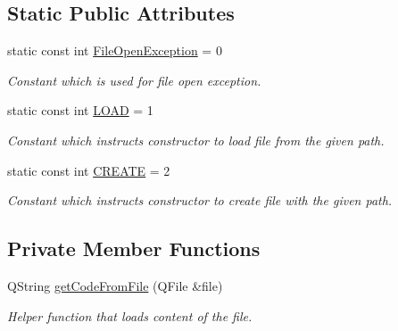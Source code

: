 \subsection*{Static Public Attributes}
\begin{DoxyCompactItemize}
\item 
static const int \hyperlink{class_script_a1be7d65c8f9b0db216570980815aacb6}{File\-Open\-Exception} = 0
\begin{DoxyCompactList}\small\item\em Constant which is used for file open exception. \end{DoxyCompactList}\item 
static const int \hyperlink{class_script_a95987e80ff92f659bf2366e6b4a42bb1}{L\-O\-A\-D} = 1
\begin{DoxyCompactList}\small\item\em Constant which instructs constructor to load file from the given path. \end{DoxyCompactList}\item 
static const int \hyperlink{class_script_a5e2d0b611f3dadbc9e79ffe28e1e5257}{C\-R\-E\-A\-T\-E} = 2
\begin{DoxyCompactList}\small\item\em Constant which instructs constructor to create file with the given path. \end{DoxyCompactList}\end{DoxyCompactItemize}
\subsection*{Private Member Functions}
\begin{DoxyCompactItemize}
\item 
Q\-String \hyperlink{class_script_a0f4c15a406618ff705b1dec27855683a}{get\-Code\-From\-File} (Q\-File \&file)
\begin{DoxyCompactList}\small\item\em Helper function that loads content of the file. \end{DoxyCompactList}\end{DoxyCompactItemize}
